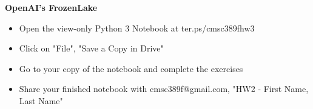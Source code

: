 \documentclass{exam}
\begin{document}
\begin{questions}

\question
\textbf{OpenAI's FrozenLake}
\begin{itemize}
\item Open the view-only Python 3 Notebook at ter.ps/cmsc389fhw3
\item Click on "File", "Save a Copy in Drive"
\item Go to your copy of the notebook and complete the exercises
\item Share your finished notebook with cmsc389f@gmail.com, "HW2 - First Name, Last Name"
\end{itemize}

\end{questions}

\end{document}
